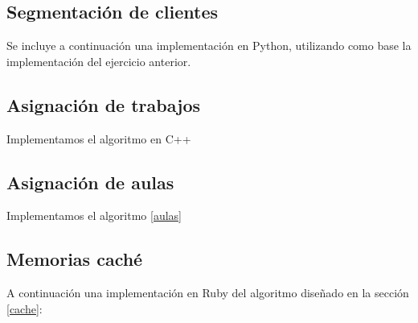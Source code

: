 \documentclass[a4paper, 11pt]{article} %
\begin{document}
      \small
	\texttt{}
      \normalsize
    
   \subsection{Segmentación de clientes}
      Se incluye a continuación una implementación en Python, utilizando como base la implementación del ejercicio anterior.\\
        \small
	\texttt{}
	\normalsize
	
	\subsection{Asignación de trabajos}
	Implementamos el algoritmo en C++
	
	\small
	\texttt{}
	\normalsize
	
	\subsection{Asignación de aulas}
	Implementamos el algoritmo \ref{aulas}
	
	\small
	\texttt{}
	\normalsize
	
	\subsection{Memorias caché}
	A continuación una implementación en Ruby del algoritmo diseñado en la sección \ref{cache}:
	
    \small
	\texttt{}
	\normalsize
    
\end{document}

